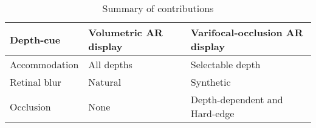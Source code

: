 \renewcommand{\arraystretch}{1.2}
\begin{table}
    \begin{center}
\begin{tabular}{|>{\centering\arraybackslash}m{3.5cm}|>{\centering\arraybackslash}m{3.0cm}|>{\centering\arraybackslash}m{4.5cm}|}
\hline
Depth-cue & Volumetric AR display & Varifocal-occlusion AR display \\
\hline
Accommodation & All depths & Selectable depth \\
\hline
Retinal blur & Natural & Synthetic \\
\hline
Occlusion & None & Depth-dependent and Hard-edge \\
\hline
\end{tabular}
    \end{center}
\caption[Summary of contributions]{Summary of contributions}
\label{tab:summary_contributions}
\end{table}
